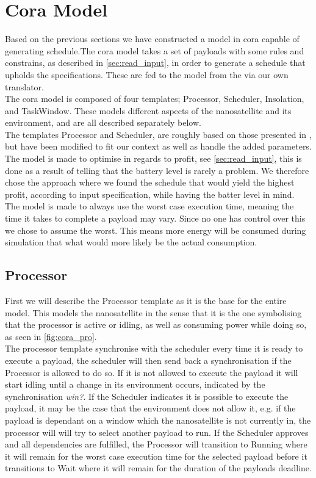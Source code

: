 \section{Cora Model} \label{sec:cora}
Based on the previous sections we have constructed a model in \gls{cora} capable of generating schedule.The \gls{cora} model takes a set of payloads with some rules and constrains, as described in \cref{sec:read_input}, in order to generate a schedule that upholds the specifications. These are fed to the model from the via our own translator.\\
The \gls{cora} model is composed of four templates; Processor, Scheduler, Insolation, and TaskWindow. These models different aspects of the nanosatellite and its environment, and are all described separately below.\\
The templates Processor and Scheduler, are roughly based on those presented in \cite{gomx3}, but have been modified to fit our context as well as handle the added parameters.\\
The model is made to optimise in regards to profit, see \cref{sec:read_input}, this is done as a result of  telling that the battery level is rarely a problem. We therefore chose the approach where we found the schedule that would yield the highest profit, according to input specification, while having the batter level in mind.\\
The model is made to always use the worst case execution time, meaning the time it takes to complete a payload may vary. Since no one has control over this we chose to assume the worst. This means more energy will be consumed during simulation that what would more likely be the actual consumption.

\subsection*{Processor}
First we will describe the Processor template as it is the base for the entire model. This models the nanosatellite in the sense that it is the one symbolising that the processor is active or idling, as well as consuming power while doing so, as seen in \cref{fig:cora_pro}. \\
The processor template synchronise with the scheduler every time it is ready to execute a payload, the scheduler will then send back a synchronisation if the Processor is allowed to do so. If it is not allowed to execute the payload it will start idling until a change in its environment occurs, indicated by the synchronisation \textit{win?}. If the Scheduler indicates it is possible to execute the payload, it may be the case that the environment does not allow it, e.g. if the payload is dependant on a window which the nanosatellite is not currently in, the processor will will try to select another payload to run. If the Scheduler approves and all dependencies are fulfilled, the Processor will transition to Running where it will remain for the worst case execution time for the selected payload before it transitions to Wait where it will remain for the duration of the payloads deadline.

